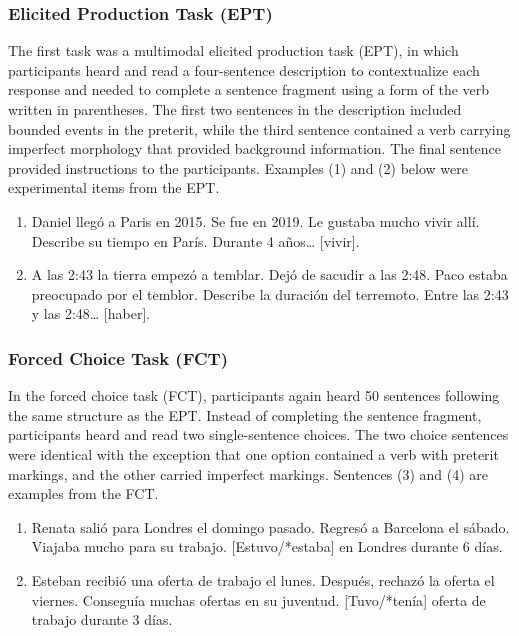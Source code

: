 \documentclass[
  english,
  man]{apa6}
\begin{document}
\hypertarget{elicited-production-task-ept}{%
\subsubsection{Elicited Production Task (EPT)}\label{elicited-production-task-ept}}

The first task was a multimodal elicited production task (EPT), in which participants heard and read a four-sentence description to contextualize each response and needed to complete a sentence fragment using a form of the verb written in parentheses. The first two sentences in the description included bounded events in the preterit, while the third sentence contained a verb carrying imperfect morphology that provided background information. The final sentence provided instructions to the participants. Examples (1) and (2) below were experimental items from the EPT.

\begin{enumerate}
\def\labelenumi{\arabic{enumi}.}
\item
  Daniel llegó a Paris en 2015. Se fue en 2019. Le gustaba mucho vivir allí. Describe su tiempo en París. Durante 4 años\ldots{} {[}vivir{]}.
\item
  A las 2:43 la tierra empezó a temblar. Dejó de sacudir a las 2:48. Paco estaba preocupado por el temblor. Describe la duración del terremoto. Entre las 2:43 y las 2:48\ldots{} {[}haber{]}.
\end{enumerate}

\hypertarget{forced-choice-task-fct}{%
\subsubsection{Forced Choice Task (FCT)}\label{forced-choice-task-fct}}

In the forced choice task (FCT), participants again heard 50 sentences following the same structure as the EPT. Instead of completing the sentence fragment, participants heard and read two single-sentence choices. The two choice sentences were identical with the exception that one option contained a verb with preterit markings, and the other carried imperfect markings. Sentences (3) and (4) are examples from the FCT.

\begin{enumerate}
\def\labelenumi{\arabic{enumi}.}
\setcounter{enumi}{2}
\item
  Renata salió para Londres el domingo pasado. Regresó a Barcelona el sábado. Viajaba mucho para su trabajo. {[}Estuvo/*estaba{]} en Londres durante 6 días.
\item
  Esteban recibió una oferta de trabajo el lunes. Después, rechazó la oferta el viernes. Conseguía muchas ofertas en su juventud. {[}Tuvo/*tenía{]} oferta de trabajo durante 3 días.
\end{enumerate}
\end{document}
